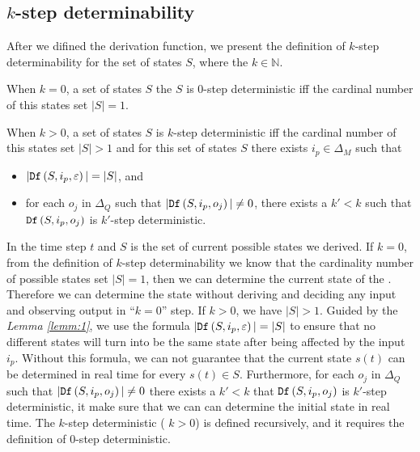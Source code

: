 \subsection{$k$-step determinability}
After we difined the derivation function, we present the definition of $k$-step determinability for the set of states $S$, where the $k\in \mathbb{N}$.%
\begin{definition} 

When $k=0$, a set of states $S$ the $S$ is $0$-step deterministic iff the cardinal number of this states set $|S|=1$. 

When $k>0$, a set of states $S$ is $k$-step deterministic
 iff the cardinal number of this states set $|S|>1$ and for this set of states $S$ there exists $i_p \in \Delta_M$ such that
 \begin{itemize}
 \item  $|{\tt Df}\left(S,i_p,\varepsilon\right)|=|S|$, and 
 \item  for each $o_j$ in $\Delta_Q$ such that $|{\tt Df}\left(S,i_p,o_j\right)|\neq 0$, there exists a ${k'}<k$ such that ${\tt Df}\left(S,i_p,o_j\right)$ is $k'$-step deterministic.
 \end{itemize}
\end{definition}

 In the time step $t$ and $S$ is the set of current possible states we derived. If $k=0$, from the definition of {\em$k$}-step determinability we know that the cardinality number of possible states set  $|S|=1$, then we can determine the current state of the \BCN. Therefore we can determine the state without deriving and deciding any input and observing output in ``$k=0$'' step. If $k>0$, we have $|S|>1$. Guided by the {\em Lemma \ref{lemm:1}}, we use the formula $|{\tt Df}\left(S,i_p,\varepsilon\right)|=|S|$ to ensure that no different states will turn into be the same state after being affected by the input $i_p$. Without this formula, we can not guarantee that the current state $s(t)$ can be determined in real time for every $s(t)\in S$. Furthermore, for each $o_j$ in $\Delta_Q$ such that $|{\tt Df}\left(S,i_p,o_j\right)|\neq 0$ there exists a ${k'}<k$ that ${\tt Df}\left(S,i_p,o_j\right)$ is $k'$-step deterministic, it make sure that we can can determine the initial state in real time. The $k$-step deterministic ( $k>0$) is defined recursively, and it requires the definition of $0$-step deterministic.

